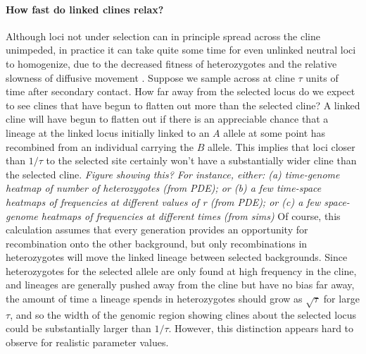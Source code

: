 \documentclass[12pt]{article}
\newcommand{\plr}[1]{{\em \color{blue} #1}}
\begin{document}
\paragraph{How fast do linked clines relax?}
Although loci not under selection can in principle spread across the cline unimpeded,
in practice it can take quite some time for even unlinked neutral loci to homogenize,
due to the decreased fitness of heterozygotes \citep{bartonbarrier}
and the relative slowness of diffusive movement \citep{sedghifar}.
Suppose we sample across at cline $\tau$ units of time after secondary contact.
How far away from the selected locus do we expect to see clines that have begun to flatten out more
than the selected cline?
A linked cline will have begun to flatten out if there is an appreciable chance that
a lineage at the linked locus initially linked to an $A$ allele 
at some point has recombined from an individual carrying the $B$ allele.
This implies that loci closer than $1/\tau$ to the selected site
certainly won't have a substantially wider cline than the selected cline.
\plr{Figure showing this? 
    For instance, either: (a) time-genome heatmap of number of heterozygotes (from PDE);
    or (b) a few time-space heatmaps of frequencies at different values of r (from PDE);
    or (c) a few space-genome heatmaps of frequencies at different times (from sims)
}
Of course, this calculation assumes that every generation provides an opportunity for recombination 
onto the other background,
but only recombinations in heterozygotes will move the linked lineage between selected backgrounds.
Since heterozygotes for the selected allele are only found at high frequency in the cline,
and lineages are generally pushed away from the cline but have no bias far away,
the amount of time a lineage spends in heterozygotes should grow as $\sqrt{\tau}$ for large $\tau$,
and so the width of the genomic region showing clines about the selected locus could be 
substantially larger than $1/\tau$.
However, this distinction appears hard to observe for realistic parameter values.
\end{document}
